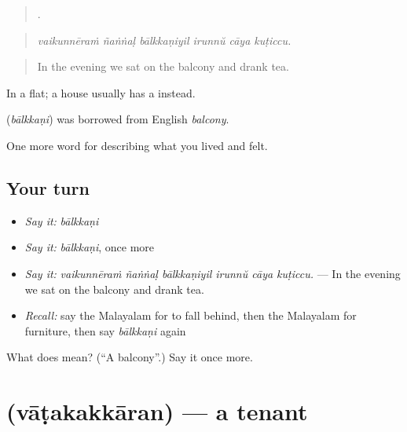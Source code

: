 \begin{quote}
     .
\end{quote}

\begin{quote}
\emph{vaikunnēraṁ ñaṅṅaḷ bālkkaṇiyil irunnŭ cāya kuṭiccu.}
\end{quote}

\begin{quote}
In the evening we sat on the balcony and drank tea.
\end{quote}

In a flat; a house usually has a  instead.

\begin{cousinweb}
\textbf{} (\emph{bālkkaṇi}) was borrowed from English \emph{balcony}.
\end{cousinweb}

\begin{grammarlens}[title={What you've built}]
One more word for describing what you lived and felt.
\end{grammarlens}

\subsection*{Your turn}
\begin{itemize}
\raggedright
  \item \emph{Say it:} \emph{bālkkaṇi}
  \item \emph{Say it:} \emph{bālkkaṇi}, once more
  \item \emph{Say it:} \emph{vaikunnēraṁ ñaṅṅaḷ bālkkaṇiyil irunnŭ cāya kuṭiccu.} — In the evening we sat on the balcony and drank tea.
  \item \emph{Recall:} say the Malayalam for to fall behind, then the Malayalam for furniture, then say \emph{bālkkaṇi} again
\end{itemize}

\begin{tcolorbox}[breakable,colback=teal!4,colframe=teal!35!black,title={Before you move on}]
What does  mean? (\textquotedblleft{}A balcony\textquotedblright{}.) Say it once more.
\end{tcolorbox}
\section[\texorpdfstring{\ml{വാടകക്കാരൻ} (vāṭakakkāran)}{വാടകക്കാരൻ (vāṭakakkāran)}]{ (vāṭakakkāran) — a tenant}

